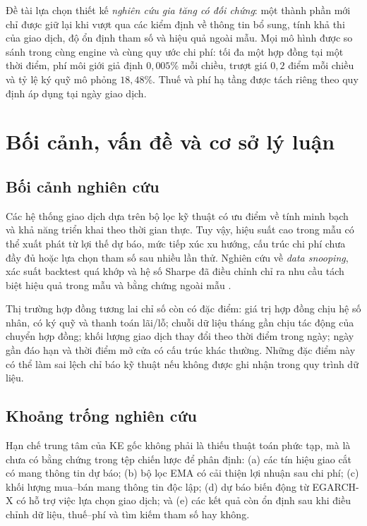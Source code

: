 \documentclass[12pt,a4paper,oneside]{article}
\begin{document}
Đề tài lựa chọn thiết kế \emph{nghiên cứu gia tăng có đối chứng}: một thành phần mới chỉ được giữ lại khi vượt qua các kiểm định về thông tin bổ sung, tính khả thi của giao dịch, độ ổn định tham số và hiệu quả ngoài mẫu. Mọi mô hình được so sánh trong cùng engine và cùng quy ước chi phí: tối đa một hợp đồng tại một thời điểm, phí môi giới giả định $0{,}005\%$ mỗi chiều, trượt giá $0{,}2$ điểm mỗi chiều và tỷ lệ ký quỹ mô phỏng $18{,}48\%$. Thuế và phí hạ tầng được tách riêng theo quy định áp dụng tại ngày giao dịch.

\section{Bối cảnh, vấn đề và cơ sở lý luận}
\subsection{Bối cảnh nghiên cứu}
Các hệ thống giao dịch dựa trên bộ lọc kỹ thuật có ưu điểm về tính minh bạch và khả năng triển khai theo thời gian thực. Tuy vậy, hiệu suất cao trong mẫu có thể xuất phát từ lợi thế dự báo, mức tiếp xúc xu hướng, cấu trúc chi phí chưa đầy đủ hoặc lựa chọn tham số sau nhiều lần thử. Nghiên cứu về \textit{data snooping}, xác suất backtest quá khớp và hệ số Sharpe đã điều chỉnh chỉ ra nhu cầu tách biệt hiệu quả trong mẫu và bằng chứng ngoài mẫu \cite{white2000,bailey2017,bailey2014}.

Thị trường hợp đồng tương lai chỉ số còn có đặc điểm: giá trị hợp đồng chịu hệ số nhân, có ký quỹ và thanh toán lãi/lỗ; chuỗi dữ liệu tháng gần chịu tác động của chuyển hợp đồng; khối lượng giao dịch thay đổi theo thời điểm trong ngày; ngày gần đáo hạn và thời điểm mở cửa có cấu trúc khác thường. Những đặc điểm này có thể làm sai lệch chỉ báo kỹ thuật nếu không được ghi nhận trong quy trình dữ liệu.

\subsection{Khoảng trống nghiên cứu}
Hạn chế trung tâm của KE gốc không phải là thiếu thuật toán phức tạp, mà là chưa có bằng chứng trong tệp chiến lược để phân định: (a) các tín hiệu giao cắt có mang thông tin dự báo; (b) bộ lọc EMA có cải thiện lợi nhuận sau chi phí; (c) khối lượng mua--bán mang thông tin độc lập; (d) dự báo biến động từ EGARCH-X có hỗ trợ việc lựa chọn giao dịch; và (e) các kết quả còn ổn định sau khi điều chỉnh dữ liệu, thuế--phí và tìm kiếm tham số hay không.
\end{document}
